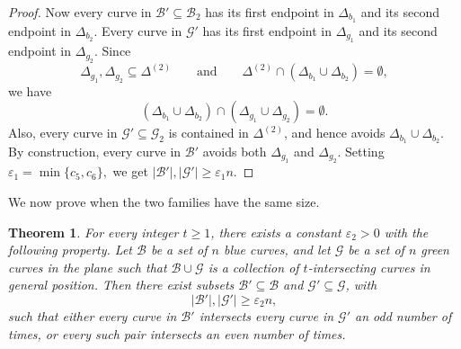 \documentclass[11pt]{article}
\theoremstyle{plain}
\newtheorem{theorem}{Theorem}[section]
\theoremstyle{definition}
\theoremstyle{remark}
\begin{document}
\begin{proof}
Now every curve in \(\mathcal B'\subseteq\mathcal B_2\) has its first
endpoint in \(\Delta_{b_1}\) and its second endpoint in \(\Delta_{b_2}\).
Every curve in \(\mathcal G'\) has its first endpoint in \(\Delta_{g_1}\)
and its second endpoint in \(\Delta_{g_2}\). Since
\[
\Delta_{g_1},\Delta_{g_2}\subseteq\Delta^{(2)}
\qquad\text{and}\qquad
\Delta^{(2)}\cap(\Delta_{b_1}\cup\Delta_{b_2})=\emptyset,
\]
we have
\[
(\Delta_{b_1}\cup\Delta_{b_2})\cap
(\Delta_{g_1}\cup\Delta_{g_2})=\emptyset.
\]
Also, every curve in \(\mathcal G'\subseteq\mathcal G_2\) is contained in
\(\Delta^{(2)}\), and hence avoids \(\Delta_{b_1}\cup\Delta_{b_2}\). By
construction, every curve in \(\mathcal B'\) avoids both
\(\Delta_{g_1}\) and \(\Delta_{g_2}\). Setting $\varepsilon_1=\min\{c_5,c_6\},$ we get $|\mathcal B'|,|\mathcal G'|\ge \varepsilon_1 n.$
\end{proof}





















We now prove  when the two families have the same size.


\begin{theorem}\label{mainbalance}
For every integer \(t \ge 1\), there exists a constant \(\varepsilon_2>0\) with
the following property. Let \(\mathcal B\) be a set of \(n\) blue curves, and
let \(\mathcal G\) be a set of \(n\) green curves in the plane such that
\(\mathcal B\cup \mathcal G\) is a collection of \(t\)-intersecting curves in
general position. Then there exist subsets
\(\mathcal B'\subseteq \mathcal B\) and
\(\mathcal G'\subseteq \mathcal G\), with
\[
|\mathcal B'|,|\mathcal G'|\ge \varepsilon_2 n,
\]
such that either every curve in \(\mathcal B'\) intersects every curve in
\(\mathcal G'\) an odd number of times, or every such pair intersects an even
number of times.
\end{theorem}
\end{document}
